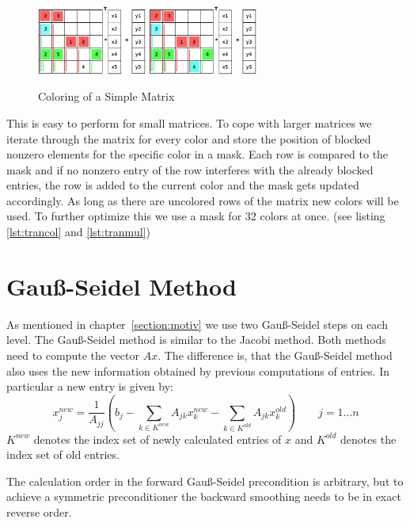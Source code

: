 \documentclass[a4paper,11pt]{scrartcl}
\begin{document}
\begin{figure}[ht]
\includegraphics[width=0.32\textwidth]{graphic/coloringT9.eps}\hfill\vline\hfill
\includegraphics[width=0.32\textwidth]{graphic/coloringT10.eps}
\caption{Coloring of a Simple Matrix}\label{figure:coloring}
\end{figure}

This is easy to perform for small matrices. To cope with larger matrices we
iterate through the matrix for every color and store the position of blocked
nonzero elements for the specific color in a mask.
Each row is compared to the mask and if no nonzero entry of the row interferes
with the already blocked entries, the row is added to the current color and the
mask gets updated accordingly.
As long as there are uncolored rows of the matrix new colors will be used.
To further optimize this we use a mask for 32 colors at once. (see listing \ref{lst:trancol}
and \ref{lst:tranmul})



\section{Gauß-Seidel Method}
As mentioned in chapter~\ref{section:motiv} we use two Gauß-Seidel steps on
each level. The Gauß-Seidel method is similar to the Jacobi method.
Both methods need to compute the vector $Ax$. The difference is, that the
Gauß-Seidel method also uses the new information obtained by previous
computations of entries.
In particular a new entry is given by:
$$ x_j^{new} = \frac{1}{A_{jj}} \left(b_{j} - \sum_{k \in K^{new}}A_{jk}
x_k^{new} - \sum_{k \in K^{old}}A_{jk} x_k^{old}\right) \qquad j = 1 \dots n$$
$K^{new}$ denotes the index set of newly calculated entries
of $x$ and $K^{old}$ denotes the index set of old entries.
\cite{numerik} \cite{numpde}

The calculation order in the forward Gauß-Seidel precondition is arbitrary,
but to achieve a symmetric preconditioner the backward smoothing needs to be
in exact reverse order.
\end{document}
